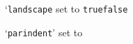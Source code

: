 \documentclass[landscape,parindent=20pt,color=green!30!black]{xkeyval-class}
\begin{document}
\blindtext[1]

\bigskip

`\texttt{landscape} set to \iflandscape \texttt{true}\else \texttt{false}\fi

`\texttt{parindent}' set to \the\parindent

\bigskip

\blindtext[1]
\end{document}
